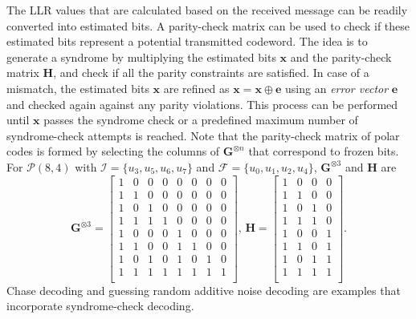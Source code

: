 \documentclass[conference]{IEEEtran}
\begin{document}
The LLR values that are calculated based on the received message can be readily converted into estimated bits. A parity-check matrix can be used to check if these estimated bits represent a potential transmitted codeword. The idea is to generate a syndrome by multiplying the estimated bits $\bm{x}$ and the parity-check matrix $\bm{H}$, and check if all the parity constraints are satisfied. In case of a mismatch, the estimated bits $\bm{x}$ are refined as $\bm{x} = \bm{x}\oplus\bm{e}$ using an \emph{error vector} $\bm{e}$ and checked again against any parity violations. This process can be performed until $\bm{x}$ passes the syndrome check or a predefined maximum number of syndrome-check attempts is reached. Note that the parity-check matrix of polar codes is formed by selecting the columns of $\bm{G}^{\otimes n}$ that correspond to frozen bits. For $\mathcal{P}(8,4)$ with $\mathcal{I} = \{u_3,u_5,u_6,u_7\}$ and $\mathcal{F} = \{u_0,u_1,u_2,u_4\}$, $\bm{G}^{\otimes 3}$ and $\bm{H}$ are
\begin{equation*}
    \bm{G}^{\otimes 3} = \left[
        \begin{smallmatrix}
            1 & 0 & 0 & 0 & 0 & 0 & 0 & 0\\
            1 & 1 & 0 & 0 & 0 & 0 & 0 & 0\\
            1 & 0 & 1 & 0 & 0 & 0 & 0 & 0\\
            1 & 1 & 1 & 1 & 0 & 0 & 0 & 0\\
            1 & 0 & 0 & 0 & 1 & 0 & 0 & 0\\
            1 & 1 & 0 & 0 & 1 & 1 & 0 & 0\\
            1 & 0 & 1 & 0 & 1 & 0 & 1 & 0\\
            1 & 1 & 1 & 1 & 1 & 1 & 1 & 1\\
        \end{smallmatrix}
        \right] \text{, }
    \bm{H} = \left[
        \begin{smallmatrix}
            1 & 0 & 0 & 0 \\
            1 & 1 & 0 & 0 \\
            1 & 0 & 1 & 0 \\
            1 & 1 & 1 & 0 \\
            1 & 0 & 0 & 1 \\
            1 & 1 & 0 & 1 \\
            1 & 0 & 1 & 1 \\
            1 & 1 & 1 & 1 \\
        \end{smallmatrix}
        \right] \text{.}
\end{equation*}
Chase decoding \cite{chase} and guessing random additive noise decoding \cite{grand} are examples that incorporate syndrome-check decoding.
\end{document}
